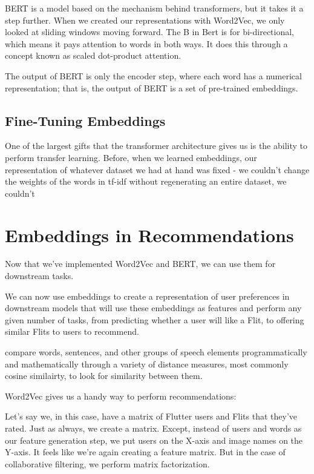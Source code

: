 \documentclass[11pt]{diazessay} %
\begin{document}
BERT is a model based on the mechanism behind transformers, but it takes it a step further. When we created our representations with Word2Vec, we only looked at sliding windows moving forward. The B in Bert is for bi-directional, which means it pays attention to words in both ways. It does this through a concept known as scaled dot-product attention. 

The output of BERT is only the encoder step, where each word has a numerical representation; that is, the output of BERT is a set of pre-trained embeddings. 

\subsection{Fine-Tuning Embeddings}

One of the largest gifts that the transformer architecture gives us is the ability to perform transfer learning. Before, when we learned embeddings, our representation of whatever dataset we had at hand was fixed - we couldn't change the weights of the words in tf-idf without regenerating an entire dataset, we couldn't 

\section{Embeddings in Recommendations}

Now that we've implemented Word2Vec and BERT, we can use them for downstream tasks. 

We can now use embeddings to create a representation of user preferences in downstream models that will use these embeddings as features and perform any given number of tasks, from predicting whether a user will like a Flit, to offering similar Flits to users to recommend. 

compare words, sentences, and other groups of speech elements programmatically and mathematically through a variety of distance measures, most commonly cosine similairty, to look for similarity between them. 

Word2Vec gives us a handy way to perform recommendations: 

Let’s say we, in this case, have a matrix of Flutter users and Flits that they’ve rated. Just as always, we create a matrix. Except, instead of users and words as our feature generation step, we put users on the X-axis and image names on the Y-axis. It feels like we’re again creating a feature matrix. But in the case of collaborative filtering, we perform matrix factorization. 
\end{document}
